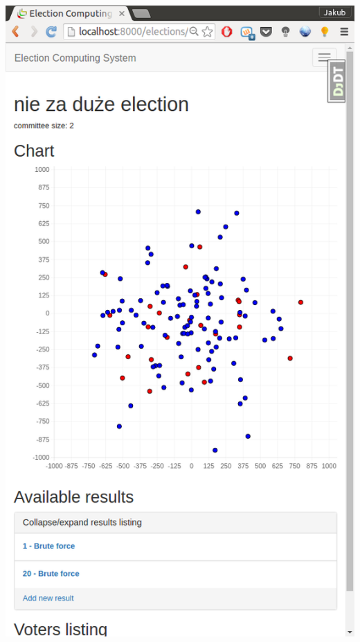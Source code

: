 \documentclass{beamer}
\begin{document}
\begin{frame}
\begin{center}
\includegraphics[height=\paperheight]{screenshots/election_details}
\end{center}
\end{frame}
\end{document}
